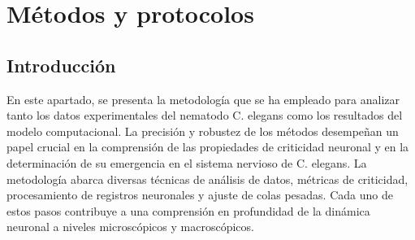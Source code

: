 \chapter{Métodos y protocolos}\label{cap:metodos_critico}
\graphicspath{{figs/capitulo_metodos_critico/}}



\section{Introducción}

%
%
%
%



En este apartado, se presenta la metodología que se ha empleado para analizar tanto los datos experimentales del nematodo C. elegans como los resultados del modelo computacional. La precisión y robustez de los métodos desempeñan un papel crucial en la comprensión de las propiedades de criticidad neuronal y en la determinación de su emergencia en el sistema nervioso de C. elegans. La metodología abarca diversas técnicas de análisis de datos, métricas de criticidad, procesamiento de registros neuronales y ajuste de colas pesadas. Cada uno de estos pasos contribuye a una comprensión en profundidad de la dinámica neuronal a niveles microscópicos y macroscópicos.

